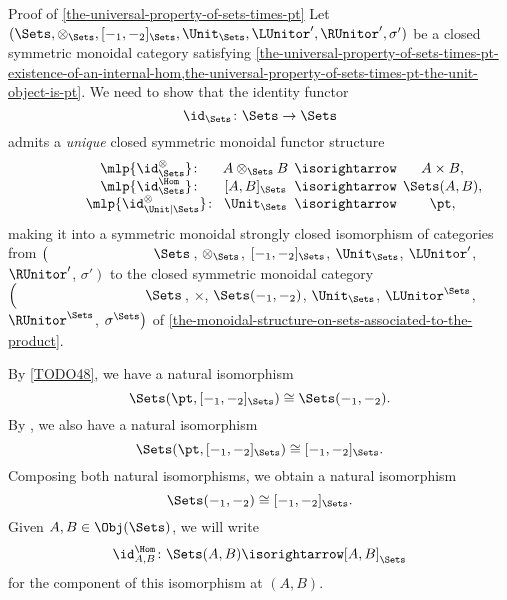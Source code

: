 \begin{Proof}{Proof of \cref{the-universal-property-of-sets-times-pt}}%
    Let $(\Sets,\otimes_{\Sets},[-_{1},-_{2}]_{\Sets},\Unit_{\Sets},\LUnitor',\RUnitor',\sigma')$ be a closed symmetric monoidal category satisfying \cref{the-universal-property-of-sets-times-pt-existence-of-an-internal-hom,the-universal-property-of-sets-times-pt-the-unit-object-is-pt}. We need to show that the identity functor
    \[
        \id_{\Sets}%
        \colon%
        \Sets%
        \to%
        \Sets%
    \]%
    admits a \emph{unique} closed symmetric monoidal functor structure
    \[%
        \begin{array}{cccc}
            \phantom{\id^{\otimes}_{\Sets}}\mlp{\id^{\otimes}_{\Sets}}       \colon\mkern-10mu & A\otimes_{\Sets}B \mkern-10mu&{}\mathbin{\isorightarrow}&\mkern-10mu{}A\times B,\\
            \phantom{\id^{\otimes}_{\Sets}}\mlp{\id^{\Hom}_{\Sets}}          \colon\mkern-10mu & [A,B]_{\Sets}     \mkern-10mu&{}\mathbin{\isorightarrow}&\mkern-10mu{}\Sets(A,B),\\
            \phantom{\id^{\otimes}_{\Sets}}\mlp{\id^{\otimes}_{\Unit|\Sets}} \colon\mkern-10mu & \Unit_{\Sets}     \mkern-10mu&{}\mathbin{\isorightarrow}&\mkern-10mu{}\pt,
        \end{array}
    \]%
    making it into a symmetric monoidal strongly closed isomorphism of categories from $\left(\phantom{\mrp{\LUnitor'}}\Sets\right.$, $\otimes_{\Sets}$, $[-_{1},-_{2}]_{\Sets}$, $\Unit_{\Sets}$, $\LUnitor'$, $\RUnitor'$, $\left.\sigma'\right)$ to the closed symmetric monoidal category $\left(\phantom{\mrp{\LUnitor^{\Sets}}}\Sets\right.$, $\times$, $\Sets(-_{1},-_{2})$, $\Unit_{\Sets}$, $\LUnitor^{\Sets}$, $\RUnitor^{\Sets}$, $\left.\sigma^{\Sets}\right)$ of \cref{the-monoidal-structure-on-sets-associated-to-the-product}.

    By \cref{TODO48}, we have a natural isomorphism
    \[
        \Sets(\pt,[-_{1},-_{2}]_{\Sets})%
        \cong%
        \Sets(-_{1},-_{2}).%
    \]%
    By , we also have a natural isomorphism
    \[
        \Sets(\pt,[-_{1},-_{2}]_{\Sets})%
        \cong%
        [-_{1},-_{2}]_{\Sets}.%
    \]%
    Composing both natural isomorphisms, we obtain a natural isomorphism
    \[
        \Sets(-_{1},-_{2})%
        \cong%
        [-_{1},-_{2}]_{\Sets}.%
    \]%
    Given $A,B\in\Obj(\Sets)$, we will write
    \[
        \id^{\Hom}_{A,B}%
        \colon%
        \Sets(A,B)%
        \isorightarrow%
        [A,B]_{\Sets}%
    \]%
    for the component of this isomorphism at $(A,B)$.


\end{Proof}
